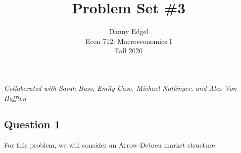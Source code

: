 \documentclass{article}
\begin{document}
\title{	Problem Set \#3 }
\author{ 	Danny Edgel 					\\ 
			Econ 712: Macroeconomics I		\\
			Fall 2020						\\
		}
\maketitle\thispagestyle{empty}


\noindent\textit{Collaborated with Sarah Bass, Emily Case, Michael Nattinger, and Alex Von Hafften}

\subsection*{Question 1}
For this problem, we will consider an Arrow-Debreu market structure.
\end{document}
